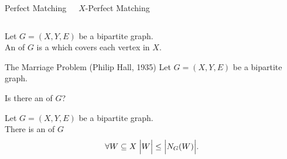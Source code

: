 \begin{frame}{}
  \begin{columns}
      \begin{center}
        Perfect Matching
      \end{center}
      \pause
      \begin{center}
        $X$-Perfect Matching
      \end{center}
  \end{columns}

  \vspace{0.30cm}
  \begin{definition}
    {\small Let $G = (X, Y, E)$ be a bipartite graph. \\[3pt]
    An  of $G$ is a 
    which covers each vertex in $X$.}
  \end{definition}
\end{frame}

\begin{frame}{}
  \begin{exampleblock}{The Marriage Problem (Philip Hall, 1935)}
    Let $G = (X, Y, E)$ be a bipartite graph.

    Is there an  of $G$?
  \end{exampleblock}

\end{frame}

\begin{frame}{}

\end{frame}

\begin{frame}{}
  \begin{theorem}
    Let $G = (X, Y, E)$ be a bipartite graph. \\[6pt]

    There is an  of $G$ 
    \[
      \forall W \subseteq X\; \Big\lvert W \Big\rvert \le \Big\lvert N_{G}(W) \Big\rvert.
    \]
  \end{theorem}
\end{frame}


